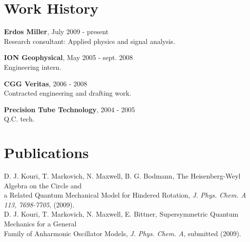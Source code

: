\documentclass[letterpaper]{article}
\begin{document}
\section*{Work History}

\begin{flushleft}
\hspace{0.25in} {\bf Erdos Miller}, July 2009 - present\\
\vspace{0.15in}
\hspace{0.75in} Research consultant: Applied physics and signal analysis. \\
\end{flushleft}
\begin{flushleft}
\hspace{0.25in} {\bf ION Geophysical}, May 2005 - sept. 2008\\
\vspace{0.15in}
\hspace{0.75in} Engineering intern. \\
\end{flushleft}
\begin{flushleft}
\hspace{0.25in} {\bf CGG Veritas}, 2006 - 2008\\
\vspace{0.15in}
\hspace{0.75in} Contracted engineering and drafting work.
\end{flushleft}
\begin{flushleft}
\hspace{0.25in} {\bf Precision Tube Technology}, 2004 - 2005\\
\vspace{0.15in}
\hspace{0.75in} Q.C. tech. \\
\end{flushleft}

\section*{Publications}

\begin{flushleft}
\hspace{0.25in} D. J. Kouri, T. Markovich, N. Maxwell, B. G. Bodmann, The Heisenberg-Weyl Algebra on the Circle and\\
\hspace{0.25in}  a Related Quantum Mechanical Model for Hindered Rotation, \textit{J. Phys. Chem. A 113, 7698-7705}, (2009).\\
\vspace{0.15in}
\hspace{0.25in} D. J. Kouri, T. Markovich, N. Maxwell, E. Bittner, Supersymmetric Quantum Mechanics for a General \\
\hspace{0.25in}    Family of Anharmonic Oscillator Models, \textit{J. Phys. Chem. A}, submitted (2009).\\
\end{flushleft}
\end{document}
